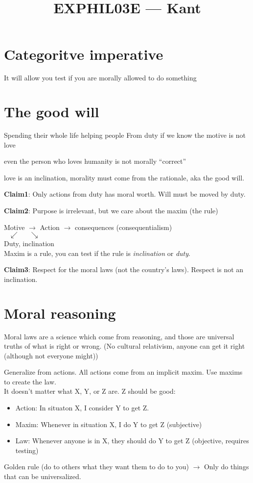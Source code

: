 \documentclass{article}
\title{EXPHIL03E --- Kant}
\begin{document}
\section{Categoritve imperative}
It will allow you test if you are morally allowed to do something

\section{The good will} 
Spending their whole life helping people
From duty if we know the motive is not love 

even the person who loves humanity is not morally ``correct''

love is an inclination, morality must come from the rationale, aka the good will.

\textbf{Claim1}: Only actions from duty has moral worth. Will must be moved by duty.

\textbf{Claim2}: Purpose is irrelevant, but we care about the maxim (the rule)

Motive $\rightarrow$ Action $\rightarrow$ consequences (consequentialism) \\
$\hspace*{1em}\swarrow\hspace*{2em}\searrow$\\
Duty, inclination \\

Maxim is a rule, you can test if the rule is \emph{inclination} or \emph{duty}.

\textbf{Claim3}: Respect for the moral laws (not the country's laws).
Respect is not an inclination.

\section{Moral reasoning}
Moral laws are a science which come from reasoning, and those are universal truths of what is right or wrong.
(No cultural relativism, anyone can get it right (although not everyone might))

Generalize from actions. All actions come from an implicit maxim.
Use maxims to create the law. \\

It doesn't matter what X, Y, or Z are. Z should be good:
\begin{itemize}
\item Action: In situaton X, I consider Y to get Z.
\item Maxim: Whenever in situation X, I do Y to get Z (subjective)
\item Law: Whenever anyone is in X, they should do Y to get Z (objective, requires testing)
\end{itemize}
Golden rule (do to others what they want them to do to you) $\rightarrow$ Only do things that can be universalized.
\end{document}
